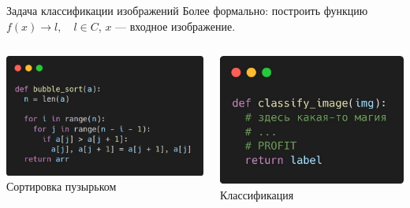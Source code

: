 \documentclass[aspectratio=169, professionalfonts]{beamer}
\begin{document}
\begin{frame}{Задача классификации изображений}
    Более формально: построить функцию
    \( f(x) \rightarrow l, \quad l \in C \), \(x\) --- входное изображение.
    \vfill
    \begin{columns}
        \begin{column}{.49\linewidth}
            \centering
            \includegraphics[width=\linewidth]{figures/fig8-bubble-sort.jpg}
            Сортировка пузырьком
        \end{column}
        \begin{column}{.43\linewidth}
            \centering
            \includegraphics[width=\linewidth]{figures/fig9-clf-function.jpg}
            Классификация
        \end{column}
    \end{columns}
\end{frame}
\end{document}
